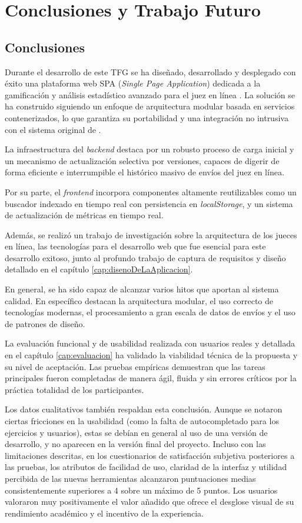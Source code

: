 \chapter{Conclusiones y Trabajo Futuro}
\label{cap:conclusiones}

\section{Conclusiones}

Durante el desarrollo de este TFG se ha diseñado, desarrollado y desplegado con éxito una plataforma web SPA (\textit{Single Page Application}) dedicada a la gamificación y análisis estadístico avanzado para el juez en línea \aer. La solución se ha construido siguiendo un enfoque de arquitectura modular basada en servicios contenerizados, lo que garantiza su portabilidad y una integración no intrusiva con el sistema original de \aer.

La infraestructura del \textit{backend} destaca por un robusto proceso de carga inicial y un mecanismo de actualización selectiva por versiones, capaces de digerir de forma eficiente e interrumpible el histórico masivo de envíos del juez en línea.

Por su parte, el \textit{frontend} incorpora componentes altamente reutilizables como un buscador indexado en tiempo real con persistencia en \textit{localStorage}, y un sistema de actualización de métricas en tiempo real.

Además, se realizó un trabajo de investigación sobre la arquitectura de los jueces en línea, las tecnologías para el desarrollo web que fue esencial para este desarrollo exitoso, junto al profundo trabajo de captura de requisitos y diseño detallado en el capítulo \ref{cap:disenoDeLaAplicacion}.

En general, se ha sido capaz de alcanzar varios hitos que aportan al sistema calidad. En específico destacan la arquitectura modular, el uso correcto de tecnologías modernas, el procesamiento a gran escala de datos de envíos y el uso de patrones de diseño.

La evaluación funcional y de usabilidad realizada con usuarios reales y detallada en el capítulo \ref{cap:evaluacion} ha validado la viabilidad técnica de la propuesta y su nivel de aceptación. Las pruebas empíricas demuestran que las tareas principales fueron completadas de manera ágil, fluida y sin errores críticos por la práctica totalidad de los participantes.

Los datos cualitativos también respaldan esta conclusión. Aunque se notaron ciertas fricciones en la usabilidad (como la falta de autocompletado para los ejercicios y usuarios), estas se debían en general al uso de una versión de desarrollo, y no aparecen en la versión final del proyecto. Incluso con las limitaciones descritas, en los cuestionarios de satisfacción subjetiva posteriores a las pruebas, los atributos de facilidad de uso, claridad de la interfaz y utilidad percibida de las nuevas herramientas alcanzaron puntuaciones medias consistentemente superiores a 4 sobre un máximo de 5 puntos. Los usuarios valoraron muy positivamente el valor añadido que ofrece el desglose visual de su rendimiento académico y el incentivo de la experiencia.

